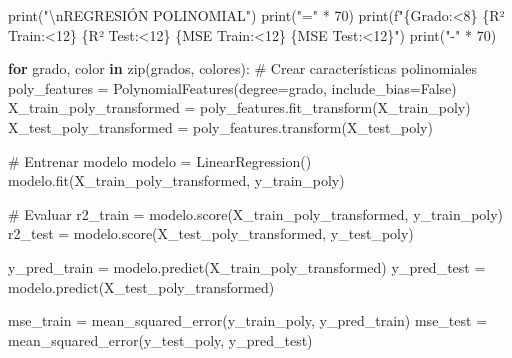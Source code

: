 \documentclass[
  doc,
  floatsintext,
  longtable,
  a4paper,
  nolmodern,
  notxfonts,
  notimes,
  12pt,
  colorlinks=true,linkcolor=blue,citecolor=blue,urlcolor=blue]{apa7}
\newenvironment{Shaded}{\begin{snugshade}}{\end{snugshade}}
\newcommand{\BuiltInTok}[1]{\textcolor[rgb]{0.00,0.23,0.31}{#1}}
\newcommand{\CharTok}[1]{\textcolor[rgb]{0.13,0.47,0.30}{#1}}
\newcommand{\CommentTok}[1]{\textcolor[rgb]{0.37,0.37,0.37}{#1}}
\newcommand{\ControlFlowTok}[1]{\textcolor[rgb]{0.00,0.23,0.31}{\textbf{#1}}}
\newcommand{\DecValTok}[1]{\textcolor[rgb]{0.68,0.00,0.00}{#1}}
\newcommand{\KeywordTok}[1]{\textcolor[rgb]{0.00,0.23,0.31}{\textbf{#1}}}
\newcommand{\NormalTok}[1]{\textcolor[rgb]{0.00,0.23,0.31}{#1}}
\newcommand{\OperatorTok}[1]{\textcolor[rgb]{0.37,0.37,0.37}{#1}}
\newcommand{\SpecialCharTok}[1]{\textcolor[rgb]{0.37,0.37,0.37}{#1}}
\newcommand{\SpecialStringTok}[1]{\textcolor[rgb]{0.13,0.47,0.30}{#1}}
\newcommand{\StringTok}[1]{\textcolor[rgb]{0.13,0.47,0.30}{#1}}
\newcommand{\VariableTok}[1]{\textcolor[rgb]{0.07,0.07,0.07}{#1}}
\begin{document}
\begin{Shaded}
\begin{Highlighting}[]
\BuiltInTok{print}\NormalTok{(}\StringTok{"}\CharTok{\textbackslash{}n}\StringTok{REGRESIÓN POLINOMIAL"}\NormalTok{)}
\BuiltInTok{print}\NormalTok{(}\StringTok{"="} \OperatorTok{*} \DecValTok{70}\NormalTok{)}
\BuiltInTok{print}\NormalTok{(}\SpecialStringTok{f"}\SpecialCharTok{\{}\StringTok{\textquotesingle{}Grado\textquotesingle{}}\SpecialCharTok{:\textless{}8\}}\SpecialStringTok{ }\SpecialCharTok{\{}\StringTok{\textquotesingle{}R² Train\textquotesingle{}}\SpecialCharTok{:\textless{}12\}}\SpecialStringTok{ }\SpecialCharTok{\{}\StringTok{\textquotesingle{}R² Test\textquotesingle{}}\SpecialCharTok{:\textless{}12\}}\SpecialStringTok{ }\SpecialCharTok{\{}\StringTok{\textquotesingle{}MSE Train\textquotesingle{}}\SpecialCharTok{:\textless{}12\}}\SpecialStringTok{ }\SpecialCharTok{\{}\StringTok{\textquotesingle{}MSE Test\textquotesingle{}}\SpecialCharTok{:\textless{}12\}}\SpecialStringTok{"}\NormalTok{)}
\BuiltInTok{print}\NormalTok{(}\StringTok{"{-}"} \OperatorTok{*} \DecValTok{70}\NormalTok{)}

\ControlFlowTok{for}\NormalTok{ grado, color }\KeywordTok{in} \BuiltInTok{zip}\NormalTok{(grados, colores):}
    \CommentTok{\# Crear características polinomiales}
\NormalTok{    poly\_features }\OperatorTok{=}\NormalTok{ PolynomialFeatures(degree}\OperatorTok{=}\NormalTok{grado, include\_bias}\OperatorTok{=}\VariableTok{False}\NormalTok{)}
\NormalTok{    X\_train\_poly\_transformed }\OperatorTok{=}\NormalTok{ poly\_features.fit\_transform(X\_train\_poly)}
\NormalTok{    X\_test\_poly\_transformed }\OperatorTok{=}\NormalTok{ poly\_features.transform(X\_test\_poly)}
    
    \CommentTok{\# Entrenar modelo}
\NormalTok{    modelo }\OperatorTok{=}\NormalTok{ LinearRegression()}
\NormalTok{    modelo.fit(X\_train\_poly\_transformed, y\_train\_poly)}
    
    \CommentTok{\# Evaluar}
\NormalTok{    r2\_train }\OperatorTok{=}\NormalTok{ modelo.score(X\_train\_poly\_transformed, y\_train\_poly)}
\NormalTok{    r2\_test }\OperatorTok{=}\NormalTok{ modelo.score(X\_test\_poly\_transformed, y\_test\_poly)}
    
\NormalTok{    y\_pred\_train }\OperatorTok{=}\NormalTok{ modelo.predict(X\_train\_poly\_transformed)}
\NormalTok{    y\_pred\_test }\OperatorTok{=}\NormalTok{ modelo.predict(X\_test\_poly\_transformed)}
    
\NormalTok{    mse\_train }\OperatorTok{=}\NormalTok{ mean\_squared\_error(y\_train\_poly, y\_pred\_train)}
\NormalTok{    mse\_test }\OperatorTok{=}\NormalTok{ mean\_squared\_error(y\_test\_poly, y\_pred\_test)}
    

\end{Highlighting}
\end{Shaded}
\end{document}
